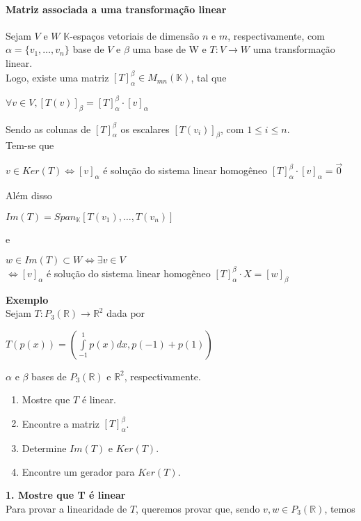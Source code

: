 \documentclass[12pt]{article}
\begin{document}
\paragraph{Matriz associada a uma transformação linear\\}
	Sejam $V$ e $W$ $\mathbb{K}$-espaços vetoriais de dimensão $n$ e $m$, respectivamente, com $\alpha = \lbrace v_1, \dots, v_n \rbrace$ base de $V$ e $\beta$ uma base de W e $T: V \rightarrow W$ uma transformação linear.\\
	Logo, existe uma matriz $[T]^\beta_\alpha \in M_{mn}(\mathbb{K})$, tal que
	\begin{center}
		$\forall v \in V, [T(v)]_\beta = [T]^\beta_\alpha \cdot [v]_\alpha$
	\end{center}
	Sendo as colunas de $[T]^\beta_\alpha$ os escalares $[T(v_i)]_\beta$, com $1 \leq i \leq n$.\\[10pt]
	Tem-se que
	\begin{center}
		$v \in Ker(T) \Leftrightarrow [v]_\alpha$ é solução do sistema linear homogêneo $[T]^\beta_\alpha \cdot [v]_\alpha = \overrightarrow{0}$
	\end{center}
	Além disso
	\begin{center}
		$Im(T) = Span_\mathbb{K}\left[ T(v_1), \dots, T(v_n)\right]$
	\end{center}
	e \begin{center}
		$w \in Im(T) \subset W \Leftrightarrow \exists v \in V$\\
		$\Leftrightarrow [v]_\alpha$ é solução do sistema linear homogêneo $[T]^\beta_\alpha \cdot X = [w]_\beta$
	\end{center}
	\textbf{Exemplo\\}
	Sejam $T: P_3(\mathbb{R}) \rightarrow \mathbb{R}^2$ dada por
	\begin{center}
		$T(p(x)) = \left( \int\limits_{-1}^1 p(x)dx, p(-1) + p(1) \right)$
	\end{center}
	$\alpha$ e $\beta$ bases de $P_3(\mathbb{R})$ e $\mathbb{R}^2$, respectivamente.
	\begin{enumerate}
	\item Mostre que $T$ é linear.
	\item Encontre a matriz $[T]^\beta_\alpha$.
	\item Determine $Im(T)$ e $Ker(T)$.
	\item Encontre um gerador para $Ker(T)$.
	\end{enumerate}
	\textbf{1. Mostre que T é linear\\}
	Para provar a linearidade de $T$, queremos provar que, sendo $v, w \in P_3(\mathbb{R})$, temos
\end{document}
